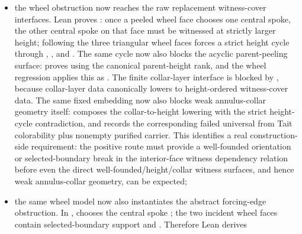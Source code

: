 \documentclass[11pt]{article}
\begin{document}
\begin{itemize}
records the exact status: Tait colorability and nonempty purified carrier
hold, while the at-most-one premise, canonical witness choice, and one-collar
geometry all fail;
\item the wheel obstruction now reaches the raw replacement witness-cover
interfaces.  Lean proves
:
once a peeled wheel face chooses one central spoke, the other central spoke on
that face must be witnessed at strictly larger height; following the three
triangular wheel faces forces a strict height cycle through ,
, and .  The same cycle now also blocks the acyclic
parent-peeling surface:  proves
using the canonical parent-height rank, and the wheel regression applies this
as
.
The finite collar-layer interface is blocked by
,
because collar-layer data canonically lowers to height-ordered witness-cover
data.  The same fixed embedding now also blocks weak annulus-collar geometry
itself:
composes the collar-to-height lowering with the strict height-cycle
contradiction, and
records the corresponding failed universal from Tait colorability plus nonempty
purified carrier.  This identifies a real construction-side requirement: the
positive route must provide a well-founded orientation or selected-boundary
break in the interior-face witness dependency relation before even the direct
well-founded/height/collar witness surfaces, and hence weak annulus-collar
geometry, can be expected;
\item the same wheel model now also instantiates the abstract forcing-edge
obstruction.  In
,
 chooses the central
spoke ; the two incident wheel faces contain selected-boundary
support  and .  Therefore Lean derives

\end{itemize}
\end{document}
